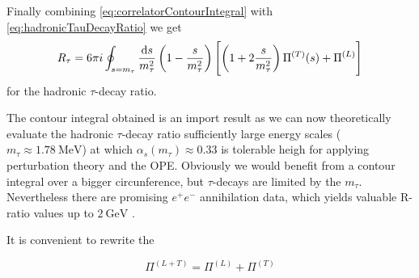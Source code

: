 \documentclass[../../index.tex]{subfiles}
\begin{document}
Finally combining \cref{eq:correlatorContourIntegral} with
\cref{eq:hadronicTauDecayRatio} we get
\begin{equation}
  R_\tau = 6 \pi i \oint_{s=m_\tau} \frac{\dif s}{m_\tau^2}
  \left( 1 - \frac{s}{m_\tau^2} \right)
  \left[ \left( 1 + 2 \frac{s}{m_\tau^2} \right) \Pi^{(T)}(s) + \Pi^{(L)} \right]
\end{equation}
for the hadronic $\tau$-decay ratio.

The contour integral obtained is an import result as we can now theoretically
evaluate the hadronic $\tau$-decay ratio sufficiently large energy scales
($m_\tau \approx \SI{1.78}{\mega\electronvolt}$) at which
$\alpha_s(m_\tau)\approx 0.33$ \cite{Pich2016} is tolerable heigh for applying
perturbation theory and the OPE. Obviously we would benefit from a contour integral over a
bigger circunference, but $\tau$-decays are limited by the $m_\tau$.
Nevertheless there are promising $e^+e^-$ annihilation data, which yields
valuable R-ratio values up to $\SI{2}{\giga\electronvolt}$
\cite{Boito2018}\cite{Keshavarzi2018}.

It is convenient to rewrite the 

\begin{equation}
  \Pi^{(L+T)} = \Pi^{(L)} + \Pi^{(T)}
\end{equation}
\end{document}
